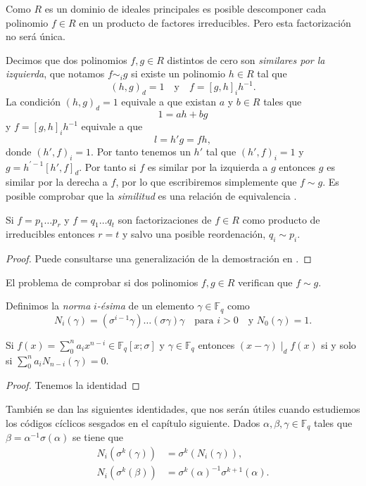Como \(R\) es un dominio de ideales principales es posible descomponer cada polinomio \(f \in R\) en un producto de factores irreducibles.
Pero esta factorización no será única.

Decimos que dos polinomios \(f, g \in R\) distintos de cero son \emph{similares por la izquierda}, que notamos \(f \sim_i g\) si existe un polinomio \(h \in R\) tal que 
\[
  (h, g)_d = 1 \quad\text{y}\quad f = [g, h]_ih^{-1}.
\]
La condición \((h, g)_d = 1\) equivale a que existan \(a\) y \(b \in R\) tales que
\[
  1 = ah + bg
\]
y \(f =  [g, h]_ih^{-1}\) equivale a que 
\[
  l = h'g = fh,
\]
donde \((h', f)_i = 1\).
Por tanto tenemos un \(h'\) tal que \((h', f)_i = 1\) y \(g = h^{'-1}[h', f]_d\).
Por tanto si \(f\) es similar por la izquierda a \(g\) entonces \(g\) es similar por la derecha a \(f\), por lo que escribiremos simplemente que \(f \sim g\).
Es posible comprobar que la \emph{similitud} es una relación de equivalencia \parencite[ver][p. 11]{jacobson_finite-dimensional_1996}.


\begin{theorem}
  Si \(f = p_1 \dots p_r\) y \(f = q_1 \dots q_t\) son factorizaciones de \(f \in R\) como producto de irreducibles entonces \(r= t\) y salvo una posible reordenación, \(q_i \sim p_i\).
\end{theorem}

\begin{proof}
  Puede consultarse una generalización de la demostración en \parencite[Teorema 1.2.9]{jacobson_finite-dimensional_1996}.
\end{proof}

El problema de comprobar si dos polinomios \(f, g \in R\) verifican que \(f \sim g\).


Definimos la \emph{norma} \(i\)\emph{-ésima} de un elemento \(\gamma \in \mathbb F_q\) como
\[
  N_i(\gamma) = (\sigma^{i-1}\gamma)\dots (\sigma \gamma)\gamma \quad\text{para } i > 0 \quad\text{y } N_0(\gamma) = 1.
\]

\begin{proposition}
  \label{prop:norma-divisor}
  Si \(f(x) = \sum_0^n a_ix^{n-i} \in \mathbb F_q[x; \sigma]\) y \(\gamma \in \mathbb F_q\) entonces \((x - \gamma) \mid_d f(x)\) si y solo si \(\sum_0^n a_iN_{n-i}(\gamma) = 0\).
\end{proposition}

\begin{proof}
  Tenemos la identidad
\end{proof}

También se dan las siguientes identidades, que nos serán útiles cuando estudiemos los códigos cíclicos sesgados en el capítulo siguiente.
Dados \(\alpha, \beta, \gamma \in \mathbb F_q\) tales que \(\beta = \alpha^{-1}\sigma(\alpha)\) se tiene que
\begin{align}
  N_i(\sigma^k(\gamma)) &= \sigma^k(N_i(\gamma)),\nonumber\\
  N_i(\sigma^k(\beta)) &= \sigma^k(\alpha)^{-1}\sigma^{k+1}(\alpha).
  \label{eq:norma-beta}
\end{align}